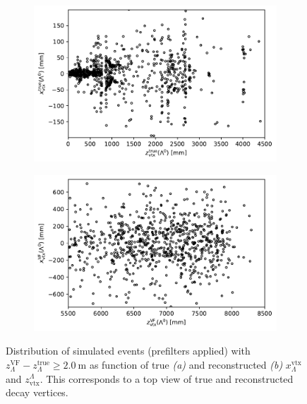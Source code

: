 \begin{figure}[t]
	\centering
	\begin{subfigure}{.45\textwidth}
		\includegraphics[width=\textwidth]{graphics/04-event_selection/bump_Lambda_true_endvertex_z_vs_x.pdf}
		\caption{}
		\label{fig:4:bump_true}
	\end{subfigure}
	\begin{subfigure}{.45\textwidth}
		\includegraphics[width=\textwidth]{graphics/04-event_selection/bump_scatter_Lambda_endvertex_z_vs_x.pdf}
		\caption{}
		\label{fig:4:bump_reco}
	\end{subfigure}
	\caption{Distribution of simulated \demonstratorshort events (prefilters applied) with $z_\Lambda^\text{VF} - z_\Lambda^\text{true} \geq \SI{2.0}{\meter}$ as function of true \textit{(a)} and reconstructed \textit{(b)} $x_\Lambda^\text{vtx}$ and $z_\text{vtx}^\Lambda$. This corresponds to a top view of true and reconstructed \lz decay vertices.}
	\label{fig:4:bump}
\end{figure}

